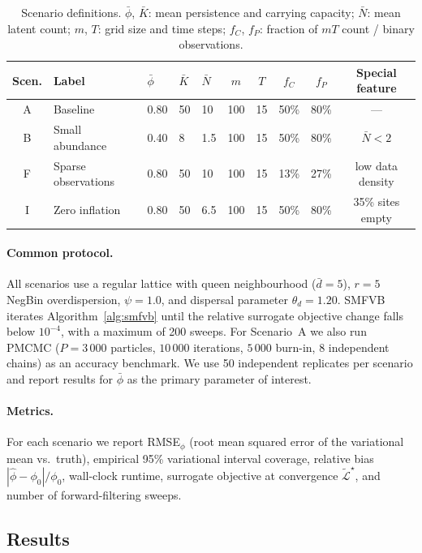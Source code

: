 \documentclass[review,12pt]{elsarticle}
\theoremstyle{definition}
\begin{document}
\begin{table}[ht]
\centering
\small
\caption{Scenario definitions.  $\bar\phi$, $\bar K$: mean persistence and carrying capacity;
$\bar N$: mean latent count; $m$, $T$: grid size and time steps;
$f_C$, $f_P$: fraction of $mT$ count / binary observations.}
\label{tab:scenarios}
\begin{tabular}{cllllccccc}
\toprule
Scen. & Label & $\bar\phi$ & $\bar K$ & $\bar N$ & $m$ & $T$
      & $f_C$ & $f_P$ & Special feature \\
\midrule
A & Baseline            & 0.80 & 50  & 10  & 100 & 15 & 50\% & 80\% & --- \\
B & Small abundance     & 0.40 & 8   & 1.5 & 100 & 15 & 50\% & 80\% & $\bar N<2$ \\
F & Sparse observations & 0.80 & 50  & 10  & 100 & 15 & 13\% & 27\% & low data density \\
I & Zero inflation      & 0.80 & 50  & 6.5 & 100 & 15 & 50\% & 80\% & 35\% sites empty \\
\bottomrule
\end{tabular}
\end{table}

\paragraph{Common protocol.}
All scenarios use a regular lattice with queen neighbourhood ($\bar{d}=5$),
$r=5$ NegBin overdispersion, $\psi=1.0$, and dispersal parameter $\theta_d=1.20$.
SMFVB iterates Algorithm~\ref{alg:smfvb} until the relative surrogate objective
change falls below $10^{-4}$, with a maximum of 200 sweeps.
For Scenario~A we also run PMCMC ($P=3\,000$ particles, $10\,000$ iterations,
$5\,000$ burn-in, 8 independent chains) as an accuracy benchmark.
We use 50 independent replicates per scenario and report results for $\bar\phi$
as the primary parameter of interest.

\paragraph{Metrics.}
For each scenario we report RMSE$_\phi$ (root mean squared error of the variational
mean vs.\ truth), empirical 95\% variational interval coverage, relative bias
$|\hat\phi-\phi_0|/\phi_0$, wall-clock runtime, surrogate objective at convergence
$\tilde{\mathcal{L}}^\star$, and number of forward-filtering sweeps.

\subsection{Results}
\end{document}

